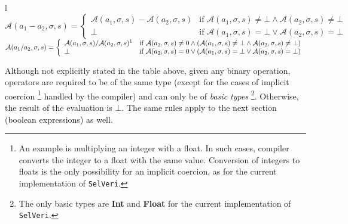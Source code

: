 \documentclass{article}
\begin{document}
\begin{table}[h!]
{{\begin{tabular}{l}
\(\mathcal{A}(a_1 - a_2, \sigma, s)= \left\{
  \begin{array}{ll}
    \mathcal{A}(a_1, \sigma, s)- \mathcal{A}(a_2, \sigma, s)& \text{if } \mathcal{A}(a_1, \sigma, s)\neq \bot \land \mathcal{A}(a_2, \sigma, s)\neq \bot \\
    \bot & \text{if } \mathcal{A}(a_1, \sigma, s)= \bot \lor \mathcal{A}(a_2, \sigma, s)= \bot
  \end{array}
\right.\) \\

\(\mathcal{A}(a_1 / a_2, \sigma, s)= \left\{
  \begin{array}{ll}
    \mathcal{A} (a_1, \sigma, s) /  \mathcal{A}(a_2, \sigma, s) \footnotemark & \text{if } \mathcal{A}(a_2, \sigma, s)\neq 0 \land (\mathcal{A}(a_1, \sigma, s)\neq \bot \land \mathcal{A}(a_2, \sigma, s)\neq \bot) \\
    \bot & \text{if } \mathcal{A}(a_2, \sigma, s)= 0 \lor (\mathcal{A}(a_1, \sigma, s)= \bot \lor \mathcal{A}(a_2, \sigma, s)= \bot)  \\
  \end{array}
\right.\) \\

\end{tabular}%
}%
} %

\caption{The semantics of arithmetic expressions}
\label{tab:arith-semantics}
\end{table}

\vspace{2.5em}

Although not explicitly stated in the table above, given any binary operation, operators are required to be of the same type (except for the cases of implicit coercion \footnote{An example is multiplying an integer with a float. In such cases, compiler converts the integer to a float with the same value. Conversion of integers to floats is the only possibility for an implicit coercion, as for the current implementation of \texttt{SelVeri}.} handled by the compiler) and can only be of \textit{basic types} \footnote{The only basic types are \textbf{Int} and \textbf{Float} for the current implementation of \texttt{SelVeri}.}. Otherwise, the result of the evaluation is $\bot$. The same rules apply to the next section (boolean expressions) as well.
\end{document}
